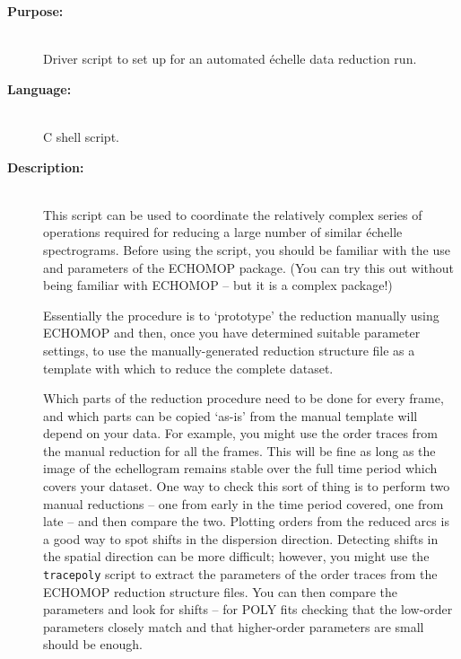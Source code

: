 \documentclass[twoside,11pt]{article}
\newcommand{\htmlref}[2]{#1}
\newcommand{\xref}[3]{#1}
\renewcommand{\_}{\texttt{\symbol{95}}}
\newcommand{\scspec}[2]{#1}
\newcommand{\scspec}[2]{#2}
\begin{document}
\begin{description}

\item [{\bf Purpose:}] \mbox{} \\
     Driver script to set up for an automated \'{e}chelle data reduction run.

\item [{\bf Language:}] \mbox{} \\
     C shell script.

\item [{\bf Description:}] \mbox{} \\
     This script can be used to coordinate the relatively complex
     series of operations required for reducing a large number of
     similar \'{e}chelle spectrograms.  Before using the script, you
     should be familiar with the use and parameters of the
     \xref{ECHOMOP}{sun152}{}
     package.  (You can try this out without being familiar with
     ECHOMOP \scspec{--}{-} but it is a complex package!)

     Essentially the procedure is to `prototype' the reduction
     manually using ECHOMOP and then, once you have determined
     suitable parameter settings, to use the manually-generated
     reduction structure file as a template with which to reduce
     the complete dataset.

     Which parts of the reduction procedure need to be done for every
     frame, and which parts can be copied `as-is' from the manual
     template will depend on your data.  For example, you might
     use the order traces from the manual reduction for all the
     frames.  This will be fine as long as the image of the echellogram
     remains stable over the full time period which covers your dataset.
     One way to check this sort of thing is to perform two manual
     reductions \scspec{--}{-} one from early in the time period covered,
     one from late \scspec{--}{-} and then compare the two.
     Plotting orders from the reduced
     arcs is a good way to spot shifts in the dispersion direction.
     Detecting shifts in the spatial direction can be more difficult;
     however, you might use the \htmlref{\texttt{tracepoly}}{se_tracepoly}
     script to extract the
     parameters of the order traces from the ECHOMOP reduction structure
     files.  You can then compare the parameters and look for shifts
     \scspec{--}{-} for POLY fits checking that the low-order parameters
     closely match and that higher-order parameters are small should be enough.


\end{description}
\end{document}
